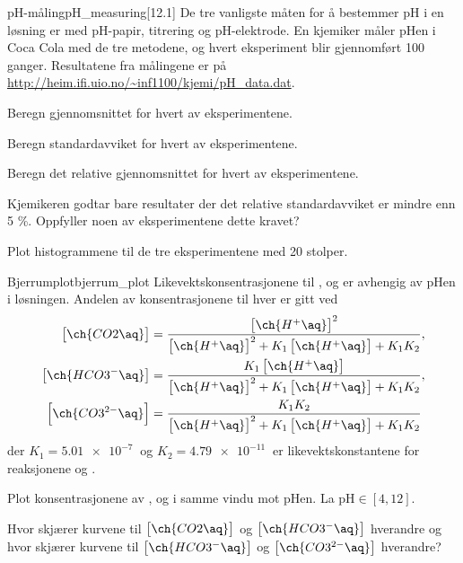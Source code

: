 \begin{exercise}{pH-måling}{pH_measuring}[12.1]
	De tre vanligste måten for å bestemmer pH i en løsning er med pH-papir, titrering og pH-elektrode. En kjemiker måler pHen i Coca Cola med de tre metodene, og hvert eksperiment blir gjennomført 100 ganger. Resultatene fra målingene er på \url{http://heim.ifi.uio.no/~inf1100/kjemi/pH_data.dat}.
	
	\subexercise Beregn gjennomsnittet for hvert av eksperimentene.
	
	\subexercise Beregn standardavviket for hvert av eksperimentene.
	
	\subexercise Beregn det relative gjennomsnittet for hvert av eksperimentene.
	
	\subexercise Kjemikeren godtar bare resultater der det relative standardavviket er mindre enn 5 \%. Oppfyller noen av eksperimentene dette kravet?
	
	\subexercise Plot histogrammene til de tre eksperimentene med 20 stolper.
\end{exercise}

\begin{exercise}{Bjerrumplot}{bjerrum_plot}
	Likevektskonsentrasjonene til ,  og  er avhengig av pHen i løsningen. Andelen av konsentrasjonene til hver er gitt ved
	\begin{align*}
		\left[ \ch{CO2\aq}\vphantom{\ch{H^+\aq}}\right] &= \frac{\left[ \ch{H^+\aq}\right]^2 }{\left[ \ch{H^+\aq}\right]^2+K_1\left[ \ch{H^+\aq}\right]+K_1K_2},\\
		\left[ \ch{HCO3^-\aq}\vphantom{\ch{H^+\aq}}\right] &= \frac{K_1\left[ \ch{H^+\aq}\right] }{\left[ \ch{H^+\aq}\right]^2+K_1\left[ \ch{H^+\aq}\right]+K_1K_2},\\
		\left[ \ch{CO3^{2-}\aq}\right] &= \frac{K_1K_2}{\left[ \ch{H^+\aq}\right]^2+K_1\left[ \ch{H^+\aq}\right]+K_1K_2}
	\end{align*}
	der $K_1=\SI{5,01e-7}{}$ og $K_2=\SI{4,79e-11}{}$ er likevektskonstantene for reaksjonene  og .
	
	\subexercise Plot konsentrasjonene av ,  og  i samme vindu mot pHen. La $\mathrm{pH}\in\left[ 4, 12\right] $.
	
	\subexercise Hvor skjærer kurvene til $\left[ \ch{CO2\aq}\right]$ og $\left[ \ch{HCO3^-\aq} \right]$ hverandre og hvor skjærer kurvene til $\left[ \ch{HCO3^-\aq} \right]$ og $\left[ \ch{CO3^{2-}\aq}\right]$ hverandre?
\end{exercise}

